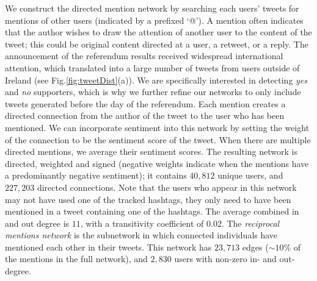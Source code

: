 \documentclass{article}
\begin{document}
We construct the directed mention network by searching each users'
tweets for mentions of other users (indicated by a prefixed `@'). A
mention often indicates that the author wishes to draw the attention
of another user to the content of the tweet; this could be original
content directed at a user, a retweet, or a reply.  The announcement
of the referendum results received widespread international attention,
which translated into a large number of tweets from users outside of
Ireland (see Fig.\ref{fig:tweetDist}(a)). We are specifically
interested in detecting {\it yes} and {\it no} supporters, which is
why we further refine our networks to only include tweets generated
before the day of the referendum.  Each mention creates a directed
connection from the author of the tweet to the user who has been
mentioned. We can incorporate sentiment into this network by setting
the weight of the connection to be the sentiment score of the
tweet. When there are multiple directed mentions, we average their
sentiment scores. The resulting network is directed, weighted and
signed (negative weights indicate when the mentions have a
predominantly negative sentiment); it contains $40,812$ unique users,
and $227,203$ directed connections. Note that the users who appear in
this network may not have used one of the tracked hashtags, they only
need to have been mentioned in a tweet containing one of the
hashtags. The average combined in and out degree is $11$, with a
transitivity coefficient of $0.02$. The {\it reciprocal mentions
  network} is the subnetwork in which connected individuals have
mentioned each other in their tweets. This network has $23,713$ edges
($\sim 10\%$ of the mentions in the full network), and $2,830$ users
with non-zero in- and out-degree.
\end{document}
